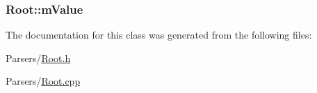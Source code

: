 \subsubsection[{\texorpdfstring{m\+Value}{mValue}}]{ Root\+::m\+Value\hspace{0.3cm}{\ttfamily [private]}}\hypertarget{classRoot_a02e28eb3c3fac3185f408446b30b5b77}{}\label{classRoot_a02e28eb3c3fac3185f408446b30b5b77}


The documentation for this class was generated from the following files\+:\begin{DoxyCompactItemize}
\item 
Parsers/\hyperlink{Root_8h}{Root.\+h}\item 
Parsers/\hyperlink{Root_8cpp}{Root.\+cpp}\end{DoxyCompactItemize}
